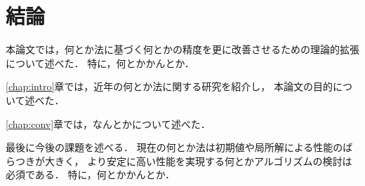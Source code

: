 \chapter{結論}
\label{chap:con}

本論文では，何とか法に基づく何とかの精度を更に改善させるための理論的拡張について述べた．
特に，何とかかんとか．

\ref{chap:intro}章では，近年の何とか法に関する研究を紹介し，
本論文の目的について述べた．

\ref{chap:conv}章では，なんとかについて述べた．

最後に今後の課題を述べる．
現在の何とか法は初期値や局所解による性能のばらつきが大きく，
より安定に高い性能を実現する何とかアルゴリズムの検討は必須である．
特に，何とかかんとか．